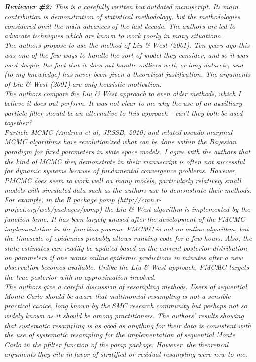 \documentclass{article}
\begin{document}
\noindent \emph{{\bf Reviewer \#2:} This is a carefully written but outdated manuscript. Its main contribution is demonstration of statistical methodology, but the methodologies considered omit the main advances of the last decade. The authors are led to advocate techniques which are known to work poorly in many situations.} \\

\noindent \emph{The authors propose to use the method of Liu \& West (2001). Ten years ago this was one of the few ways to handle the sort of model they consider, and so it was used despite the fact that it does not handle outliers well, or long datasets, and (to my knowledge) has never been given a theoretical justification. The arguments of Liu \& West (2001) are only heuristic motivation.} \\

\noindent \emph{The authors compare the Liu \& West approach to even older methods, which I believe it does out-perform. It was not clear to me why the use of an auxilliary particle filter should be an alternative to this approach - can't they both be used together?} \\

\noindent \emph{Particle MCMC (Andrieu et al, JRSSB, 2010) and related pseudo-marginal MCMC algorithms have revolutionized what can be done within the Bayesian paradigm for fixed parameters in state space models. I agree with the authors that the kind of MCMC they demonstrate in their manuscript is often not successful for dynamic systems because of fundamental convergence problems. However, PMCMC does seem to work well on many models, particularly relatively small models with simulated data such as the authors use to demonstrate their methods. For example, in the R package pomp (http://cran.r-project.org/web/packages/pomp) the Liu \& West algorithm is implemented by the function bsmc. It has been largely unused after the development of the PMCMC implementation in the function pmcmc. PMCMC is not an online algorithm, but the timescale of epidemics probably allows running code for a few hours. Also, the state estimates can readily be updated based on the current posterior distribution on parameters if one wants online epidemic predictions in minutes after a new observation becomes available. Unlike the Liu \& West approach, PMCMC targets the true posterior with no approximation involved.} \\

\noindent \emph{The authors give a careful discussion of resampling methods. Users of sequential Monte Carlo should be aware that multinomial resampling is not a sensible practical choice, long known by the SMC research community but perhaps not so widely known as it should be among practitioners. The authors' results showing that systematic resampling is as good as anything for their data is consistent with the use of systematic resampling for the implementation of sequential Monte Carlo in the pfilter function of the pomp package. However, the theoretical arguments they cite in favor of stratified or residual resampling were new to me.} \\
\end{document}

